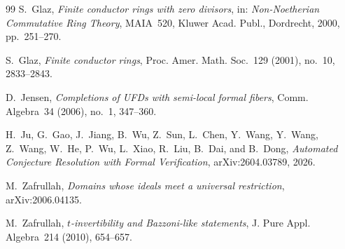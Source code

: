 \documentclass[11pt,reqno]{amsart}
\numberwithin{equation}{section}
\theoremstyle{definition}
\begin{document}
\begin{thebibliography}{99}
S.~Glaz, \emph{Finite conductor rings with zero divisors},
in: \emph{Non-Noetherian Commutative Ring Theory}, MAIA~520,
Kluwer Acad. Publ., Dordrecht, 2000, pp.~251--270.

S.~Glaz, \emph{Finite conductor rings},
Proc. Amer. Math. Soc.~129 (2001), no.~10, 2833--2843.

D.~Jensen, \emph{Completions of UFDs with semi-local formal fibers},
Comm. Algebra~34 (2006), no.~1, 347--360.

H.~Ju, G.~Gao, J.~Jiang, B.~Wu, Z.~Sun, L.~Chen, Y.~Wang,
Y.~Wang, Z.~Wang, W.~He, P.~Wu, L.~Xiao, R.~Liu, B.~Dai, and B.~Dong,
\emph{Automated Conjecture Resolution with Formal Verification},
arXiv:2604.03789, 2026.

M.~Zafrullah, \emph{Domains whose ideals meet a universal restriction},
arXiv:2006.04135.

M.~Zafrullah, \emph{$t$-invertibility and Bazzoni-like statements},
J. Pure Appl. Algebra~214 (2010), 654--657.

\end{thebibliography}
\end{document}

